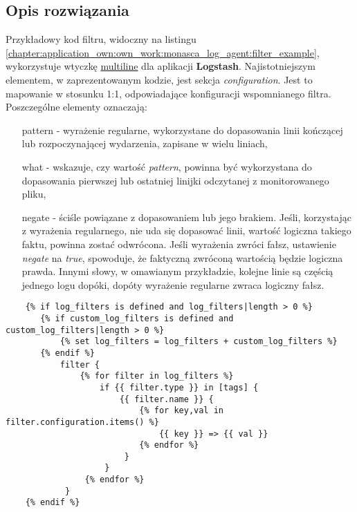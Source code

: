     \subsection{Opis rozwiązania}
    Przykładowy kod filtru, widoczny na listingu \ref{chapter:application_own:own_work:monasca_log_agent:filter_example}, 
    wykorzystuje wtyczkę \href{https://www.elastic.co/guide/en/logstash/current/plugins-filters-multiline.html}{multiline} 
    dla aplikacji \textbf{Logstash}. Najistotniejszym elementem, w zaprezentowanym kodzie, jest sekcja 
    \textit{configuration}. Jest to mapowanie w stosunku 1:1, odpowiadające konfiguracji wspomnianego filtra. Poszczególne 
    elementy oznaczają:
    \begin{itemize}
        \item[pattern] - wyrażenie regularne, wykorzystane do dopasowania linii kończącej lub rozpoczynającej wydarzenia, zapisane w wielu liniach,
        \item[what] - wskazuje, czy wartość \textit{pattern}, powinna być wykorzystana do dopasowania pierwszej lub ostatniej linijki odczytanej
        z monitorowanego pliku,
        \item[negate] - ściśle powiązane z dopasowaniem lub jego brakiem. Jeśli, korzystając z wyrażenia regularnego, nie uda się dopasować linii,
        wartość logiczna takiego faktu, powinna zostać odwrócona. Jeśli wyrażenia zwróci fałsz, ustawienie \textit{negate} na \textit{true}, 
        spowoduje, że faktyczną zwróconą wartością będzie logiczna prawda. Innymi słowy, w omawianym przykładzie, kolejne linie są częścią jednego
        logu dopóki, dopóty wyrażenie regularne zwraca logiczny fałsz. 
    \end{itemize}
    
    \begin{listing}[H]
        \begin{verbatim}
    {% if log_filters is defined and log_filters|length > 0 %}
       {% if custom_log_filters is defined and custom_log_filters|length > 0 %}
           {% set log_filters = log_filters + custom_log_filters %}
       {% endif %}
           filter {
               {% for filter in log_filters %}
                   if {{ filter.type }} in [tags] {
                       {{ filter.name }} {
                           {% for key,val in filter.configuration.items() %}
                               {{ key }} => {{ val }}
                           {% endfor %}
                        }
                    }
                {% endfor %}
            }
    {% endif %}
        \end{verbatim}
        \caption[Wpisanie filtrów do pliku konfiguracyjnego \textbf{Logstash}]{
            Wpisanie filtrów do pliku konfiguracyjnego \textbf{Logstash}, źródło: \url{https://github.com/FujitsuEnablingSoftwareTechnologyGmbH/ansible-monasca-log-agent/blob/master/templates/agent.conf.j2}}
        \label{chapter:application_own:own_work:monasca_log_agent:filter_applying}
    \end{listing}
    
